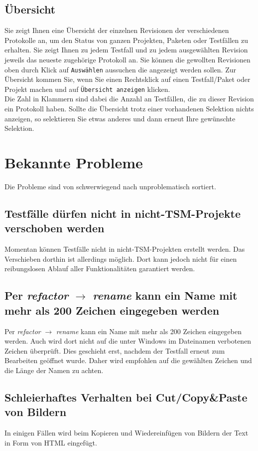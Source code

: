 \documentclass[11pt,a4paper,titlepage]{article}
\begin{document}
\subsection{Übersicht}
Sie zeigt Ihnen eine Übersicht der einzelnen Revisionen der verschiedenen Protokolle an, um den Status von ganzen Projekten, Paketen oder Testfällen zu erhalten.
Sie zeigt Ihnen zu jedem Testfall und zu jedem ausgewählten Revision jeweils das neueste zugehörige Protokoll an.
Sie können die gewollten Revisionen oben durch Klick auf \texttt{Auswählen} aussuchen die angezeigt werden sollen.
Zur Übersicht kommen Sie, wenn Sie einen Rechtsklick auf einen Testfall/Paket oder Projekt machen und auf \texttt{Übersicht anzeigen} klicken.\\
Die Zahl in Klammern sind dabei die Anzahl an Testfällen, die zu dieser Revision ein Protokoll haben.
Sollte die Übersicht trotz einer vorhandenen Selektion nichts anzeigen, so selektieren Sie etwas anderes und dann erneut Ihre gewünschte Selektion.


\section{Bekannte Probleme}
Die Probleme sind von schwerwiegend nach unproblematisch sortiert.\\

\subsection*{Testfälle dürfen nicht in nicht-TSM-Projekte verschoben werden}
Momentan können Testfälle nicht in nicht-TSM-Projekten erstellt werden. Das Verschieben dorthin ist allerdings möglich. Dort kann jedoch nicht für einen reibungslosen Ablauf aller Funktionalitäten garantiert werden.

\subsection*{Per \textit{refactor} $ \rightarrow $ \textit{rename} kann ein Name mit mehr als 200 Zeichen eingegeben werden}
Per \textit{refactor} $ \rightarrow $ \textit{rename} kann ein Name mit mehr als 200 Zeichen eingegeben werden. Auch wird dort nicht auf die unter Windows im Dateinamen verbotenen Zeichen überprüft.
Dies geschieht erst, nachdem der Testfall erneut zum Bearbeiten geöffnet wurde. Daher wird empfohlen auf die gewählten Zeichen und die Länge der Namen zu achten.

\subsection*{Schleierhaftes Verhalten bei Cut/Copy\&Paste von Bildern}
In einigen Fällen wird beim Kopieren und Wiedereinfügen von Bildern der Text in Form von HTML eingefügt.
\end{document}
